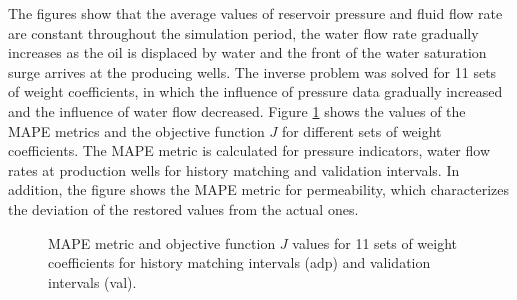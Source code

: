 \documentclass[
11pt,%
tightenlines,%
twoside,%
onecolumn,%
nofloats,%
nobibnotes,%
nofootinbib,%
superscriptaddress,%
noshowpacs,%
centertags]%
{revtex4}
\begin{document}
The figures show that the average values of reservoir pressure and fluid flow rate are constant throughout the simulation period, the water flow rate gradually increases as the oil is displaced by water and the front of the water saturation surge arrives at the producing wells.
The inverse problem was solved for 11 sets of weight coefficients, in which the influence of
pressure data gradually increased and the influence of water flow
decreased. Figure \ref{fig:wp} shows the values of the MAPE metrics
and the objective function $J$ for different sets of weight
coefficients. The MAPE metric is calculated for pressure indicators,
water flow rates at production wells for history matching and
validation intervals. In addition, the figure shows the MAPE metric
for permeability, which characterizes the deviation of the restored
values from the actual ones.

\begin{figure}
\caption{MAPE metric and objective function $J$ values for 11 sets
of weight coefficients for history matching
        intervals (adp) and validation intervals (val).}
    \label{fig:wp}
\end{figure}
\end{document}
